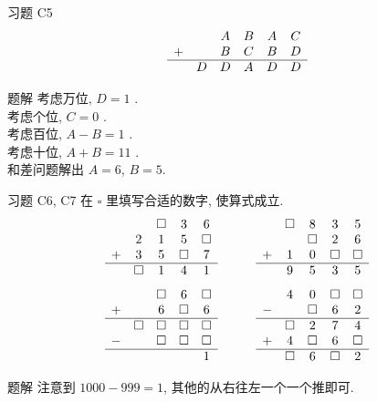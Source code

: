 \documentclass[content.tex]{subfiles}
\begin{document}
\begin{frame}{习题 C5}
$$
\begin{matrix}
  &   & A & B & A & C \\
+ &   & B & C & B & D \\
\hline
  & D & D & A & D & D \\
\end{matrix}
$$
\begin{exampleblock}{题解}
考虑万位, $D = 1$ . \\
考虑个位, $C = 0$ . \\
考虑百位, $A-B=1$ . \\
考虑十位, $A+B=11$ . \\
和差问题解出 $A=6$, $B=5$.
\end{exampleblock}
\end{frame}

\begin{frame}{习题 C6, C7}
在 $\square$ 里填写合适的数字, 使算式成立.
$$
\begin{matrix}
  &         & \square &       3 &       6 \\
  &       2 &       1 &       5 & \square \\
+ &       3 &       5 & \square &       7 \\
\hline
  & \square &       1 &       4 &       1 \\
\end{matrix}
\qquad\qquad
\begin{matrix}
  & \square &       8 &       3 &       5 \\
  &         & \square &       2 &       6 \\
+ &       1 &       0 & \square & \square \\
\hline
  &       9 &       5 &       3 &       5 \\
\end{matrix}
$$
$$
\begin{matrix}
  &         & \square &       6 & \square \\
+ &         &       6 & \square &       6 \\
\hline
  & \square & \square & \square & \square \\
- &         & \square & \square & \square \\
\hline
  &         &         &         &       1 \\
\end{matrix}
\qquad\qquad
\begin{matrix}
  &       4 &       0 & \square & \square \\
- &         & \square &       6 &       2 \\
\hline
  & \square &       2 &       7 &       4 \\
+ &       4 & \square &       6 & \square \\
\hline
  & \square &       6 & \square &       2 \\
\end{matrix}
$$
\begin{exampleblock}{题解}
注意到 $1000-999=1$, 其他的从右往左一个一个推即可.
\end{exampleblock}
\end{frame}
\end{document}
